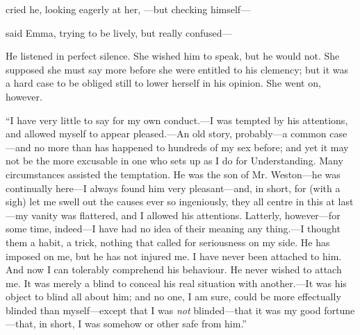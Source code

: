  cried he, looking eagerly at her, ---but checking himself---

 said Emma, trying to be lively, but really confused---

He listened in perfect silence. She wished him to speak, but he would not. She supposed she must say more before she were entitled to his clemency; but it was a hard case to be obliged still to lower herself in his opinion. She went on, however.

“I have very little to say for my own conduct.---I was tempted by his attentions, and allowed myself to appear pleased.---An old story, probably---a common case---and no more than has happened to hundreds of my sex before; and yet it may not be the more excusable in one who sets up as I do for Understanding. Many circumstances assisted the temptation. He was the son of Mr. Weston---he was continually here---I always found him very pleasant---and, in short, for (with a sigh) let me swell out the causes ever so ingeniously, they all centre in this at last---my vanity was flattered, and I allowed his attentions. Latterly, however---for some time, indeed---I have had no idea of their meaning any thing.---I thought them a habit, a trick, nothing that called for seriousness on my side. He has imposed on me, but he has not injured me. I have never been attached to him. And now I can tolerably comprehend his behaviour. He never wished to attach me. It was merely a blind to conceal his real situation with another.---It was his object to blind all about him; and no one, I am sure, could be more effectually blinded than myself---except that I was {\em not} blinded---that it was my good fortune---that, in short, I was somehow or other safe from him.”

